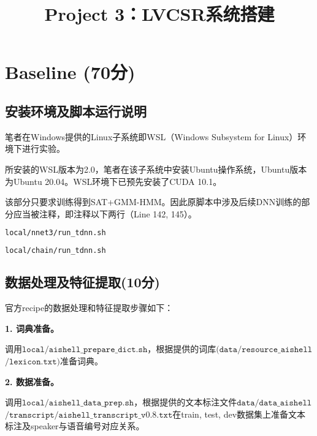 \documentclass[a4paper]{article}
\title{Project 3：LVCSR系统搭建}
\renewcommand{\tt}[1]{\mathtt{#1}}
\begin{document}
\maketitle

\section{Baseline (70分)}

\setcounter{subsection}{-1}
\subsection{安装环境及脚本运行说明}

笔者在Windows提供的Linux子系统即WSL（Windows Subsystem for Linux）环境下进行实验。

所安装的WSL版本为2.0，笔者在该子系统中安装Ubuntu操作系统，Ubuntu版本为Ubuntu 20.04。WSL环境下已预先安装了CUDA 10.1。

该部分只要求训练得到SAT+GMM-HMM。因此原脚本中涉及后续DNN训练的部分应当被注释，即注释以下两行（Line 142, 145）。

\begin{lstlisting}[language=bash,firstnumber=142]
local/nnet3/run_tdnn.sh
\end{lstlisting}
\vspace{-1em}
\begin{lstlisting}[language=bash,firstnumber=145]
local/chain/run_tdnn.sh
\end{lstlisting}

\vspace{-0.3em}
\subsection{数据处理及特征提取(10分)}

官方recipe的数据处理和特征提取步骤如下：

\vspace{1em}
\textbf{1. 词典准备。} 

调用$\tt{local}/\tt{aishell}\_\tt{prepare\_dict.sh}$，根据提供的词库$(\tt{data/resource\_aishell}$ $\tt{/lexicon.txt})$准备词典。

\vspace{1em}
\textbf{2. 数据准备。} 

调用$\tt{local/aishell\_data\_prep.sh}$，根据提供的文本标注文件$\tt{data/data\_aishell}$ $\tt{/transcript/aishell\_transcript\_v0.8.txt}$在train, test, dev数据集上准备文本标注及speaker与语音编号对应关系。
\end{document}
